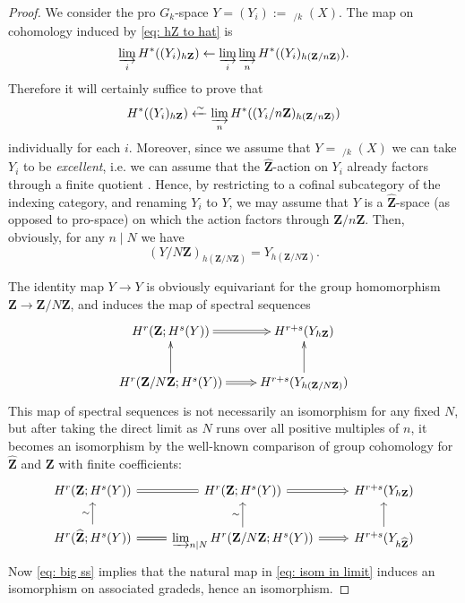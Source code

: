 \documentclass[10pt, reqno]{amsart}
\numberwithin{equation}{subsection}
\newcommand{\Z}{\mathbf{Z}}
\newcommand{\wh}[1]{\widehat{#1}}
\DeclareMathOperator{\Et}{\acute{E}t}
\theoremstyle{remark}
\begin{document}
\begin{proof} 
We consider the pro $G_k$-space $Y = (Y_i) := \Et_{/k}(X)$. The map on cohomology induced by \eqref{eq: hZ to hat} is 
\[
\varinjlim_i H^*((Y_i)_{h\Z} ) \leftarrow \varinjlim_i \varinjlim_n H^*((Y_i)_{h(\Z/n\Z)}).
\]
Therefore it will certainly suffice to prove that 
\begin{equation}\label{eq: isom in limit}
H^*((Y_i)_{h\Z} ) \xleftarrow{\sim} \varinjlim_n H^*((Y_i/n\Z)_{h(\Z/n\Z)})
\end{equation}
individually for each $i$. Moreover, since we assume that $Y = \Et_{/k}(X)$ we can take $Y_i$ to be \emph{excellent}, i.e. we can assume that the $\wh{\Z}$-action on $Y_i$ already factors through a finite quotient \cite[\S 9.2.3, p.296-297]{HS}. Hence, by restricting to a cofinal subcategory of the indexing category, and renaming $Y_i$ to $Y$, we may assume that $Y$ is a $\wh{\Z}$-space (as opposed to pro-space) on which the action factors through $\Z/n\Z$. Then, obviously, for any $n \mid N$ we have  
\[
(Y/N\Z)_{h(\Z/N\Z)}  = Y_{h(\Z/N\Z)}.
\]

The identity map $Y \rightarrow Y$ is obviously equivariant for the group homomorphism $\Z \rightarrow \Z/N\Z$, and induces the map of spectral sequences
\begin{equation}
\xymatrix{
H^r(\Z; H^s(Y)) \ar@{=>}[r]  & H^{r+s}(Y_{h\Z}) \\
H^r(\Z/N\Z; H^s(Y)) \ar@{=>}[r] \ar[u] & H^{r+s}(Y_{h(\Z/N\Z)}) \ar[u] \\
}
\end{equation}
This map of spectral sequences is not necessarily an isomorphism for any fixed $N$, but after taking the direct limit as $N$ runs over all positive multiples of $n$, it becomes an isomorphism by the well-known comparison of group cohomology for $\wh{\Z}$ and $\Z$ with finite coefficients:
\begin{equation}\label{eq: big ss}
\begin{tikzcd}
H^r(\Z; H^s(Y)) \ar[r, equals] & H^r(\Z; H^s(Y)) \ar[r, Rightarrow]  & H^{r+s}(Y_{h\Z}) \\
H^r(\wh{\Z}; H^s(Y)) \ar[r, equals] \ar[u, "\sim"] & \varinjlim_{n \mid N} H^r(\Z/N\Z; H^s(Y)) \ar[r, Rightarrow] \ar[u, "\sim"] & H^{r+s}(Y_{h\wh{\Z}}) \ar[u] 
\end{tikzcd}
\end{equation}
Now \eqref{eq: big ss} implies that the natural map in \eqref{eq: isom in limit} induces an isomorphism on associated gradeds, hence an isomorphism. 
\end{proof}
\end{document}
